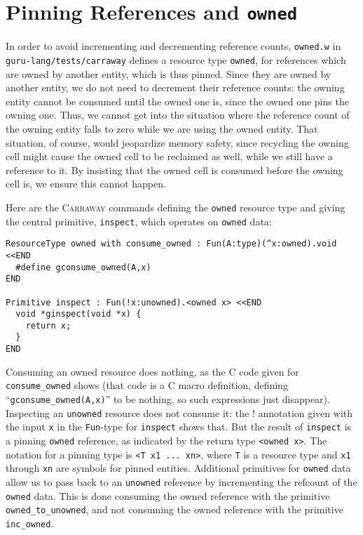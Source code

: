 \documentclass{book}[12pt]
\newcommand{\carraway}[0]{\textsc{Carraway}\xspace}
\begin{document}
\section{Pinning References and \texttt{owned}}

In order to avoid incrementing and decrementing reference counts,
\texttt{owned.w} in \texttt{guru-lang/tests/carraway} defines a
resource type \texttt{owned}, for references which are owned by
another entity, which is thus pinned.  Since they are owned by another
entity, we do not need to decrement their reference counts: the owning
entity cannot be consumed until the owned one is, since the owned one
pins the owning one.  Thus, we cannot get into the situation where the
reference count of the owning entity falls to zero while we are using
the owned entity.  That situation, of course, would jeopardize memory
safety, since recycling the owning cell might cause the owned cell to
be reclaimed as well, while we still have a reference to it.  By
insisting that the owned cell is consumed before the owning cell is,
we ensure this cannot happen.

Here are the \carraway commands defining the \texttt{owned} resource
type and giving the central primitive, \texttt{inspect}, which
operates on \texttt{owned} data:

\begin{verbatim}
ResourceType owned with consume_owned : Fun(A:type)(^x:owned).void <<END
  #define gconsume_owned(A,x) 
END

Primitive inspect : Fun(!x:unowned).<owned x> <<END
  void *ginspect(void *x) {
    return x;
  }
END
\end{verbatim}

\noindent Consuming an owned resource does nothing, as the C code
given for \texttt{consume\_owned} shows (that code is a C macro
definition, defining ``\texttt{gconsume\_owned(A,x)}'' to be nothing,
so such expressions just disappear).  Inspecting an \texttt{unowned}
resource does not consume it: the ! annotation given with the input
\texttt{x} in the \texttt{Fun}-type for \texttt{inspect} shows that.
But the result of \texttt{inspect} is a pinning \texttt{owned}
reference, as indicated by the return type \texttt{<owned x>}.  The
notation for a pinning type is \texttt{<T x1 ... xn>}, where
\texttt{T} is a resource type and \texttt{x1} through \texttt{xn} are
symbols for pinned entities.  Additional primitives for \texttt{owned}
data allow us to pass back to an \texttt{unowned} reference by
incrementing the refcount of the \texttt{owned} data.  This is done
consuming the owned reference with the primitive
\texttt{owned\_to\_unowned}, and not consuming the owned reference
with the primitive \texttt{inc\_owned}.  
\end{document}
